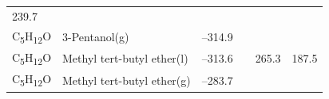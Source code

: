 \documentclass[
  9pt,
]{extbook}
\theoremstyle{definition}
\theoremstyle{definition}
\theoremstyle{definition}
\theoremstyle{remark}
\begin{document}
\begin{longtable}[]{@{}llllll@{}}
\begin{minipage}[t]{0.14\columnwidth}
239.7\strut
\end{minipage}\tabularnewline
\begin{minipage}[t]{0.07\columnwidth}\raggedright
C\textsubscript{5}H\textsubscript{12}O\strut
\end{minipage} & \begin{minipage}[t]{0.17\columnwidth}\raggedright
3-Pentanol(g)\strut
\end{minipage} & \begin{minipage}[t]{0.15\columnwidth}\raggedright
--314.9\strut
\end{minipage} & \begin{minipage}[t]{0.15\columnwidth}\raggedright
\strut
\end{minipage} & \begin{minipage}[t]{0.14\columnwidth}\raggedright
\strut
\end{minipage} & \begin{minipage}[t]{0.14\columnwidth}\raggedright
\strut
\end{minipage}\tabularnewline
\begin{minipage}[t]{0.07\columnwidth}\raggedright
C\textsubscript{5}H\textsubscript{12}O\strut
\end{minipage} & \begin{minipage}[t]{0.17\columnwidth}\raggedright
Methyl tert-butyl
ether(l)\strut
\end{minipage} & \begin{minipage}[t]{0.15\columnwidth}\raggedright
--313.6\strut
\end{minipage} & \begin{minipage}[t]{0.15\columnwidth}\raggedright
\strut
\end{minipage} & \begin{minipage}[t]{0.14\columnwidth}\raggedright
265.3\strut
\end{minipage} & \begin{minipage}[t]{0.14\columnwidth}\raggedright
187.5\strut
\end{minipage}\tabularnewline
\begin{minipage}[t]{0.07\columnwidth}\raggedright
C\textsubscript{5}H\textsubscript{12}O\strut
\end{minipage} & \begin{minipage}[t]{0.17\columnwidth}\raggedright
Methyl tert-butyl
ether(g)\strut
\end{minipage} & \begin{minipage}[t]{0.15\columnwidth}\raggedright
--283.7\strut
\end{minipage} & \begin{minipage}[t]{0.15\columnwidth}\raggedright

\end{minipage}
\end{longtable}
\end{document}
